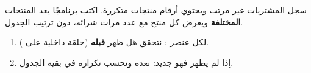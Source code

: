 \begin{statement}
سجل المشتريات غير مرتب ويحتوي أرقام منتجات متكررة. اكتب برنامجًا يعد المنتجات \textbf{المختلفة} ويعرض كل منتج مع عدد مرات شرائه، دون ترتيب الجدول.
\end{statement}
\begin{stepsbox}\begin{enumerate}
\item لكل عنصر : نتحقق هل ظهر \textbf{قبله} (حلقة داخلية على ).
\item إذا لم يظهر فهو جديد: نعده ونحسب تكراره في بقية الجدول.
\end{enumerate}\end{stepsbox}
